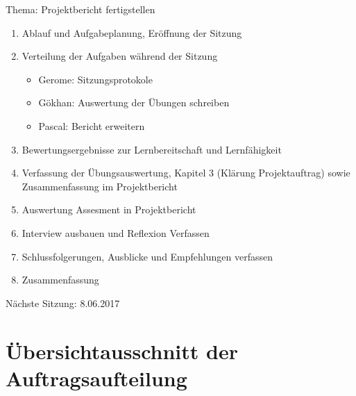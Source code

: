 Thema: Projektbericht fertigstellen
\begin{enumerate}

\item Ablauf und Aufgabeplanung, Eröffnung der Sitzung 

\item  Verteilung der Aufgaben während der Sitzung
\begin{itemize}
\item Gerome: Sitzungsprotokole
\item Gökhan: Auswertung der Übungen schreiben
\item Pascal: Bericht erweitern
\end{itemize}

\item Bewertungsergebnisse zur Lernbereitschaft und Lernfähigkeit

\item Verfassung der Übungsauswertung, Kapitel 3 (Klärung Projektauftrag)  sowie Zusammenfassung im Projektbericht 

\item Auswertung Assesment in Projektbericht

\item Interview ausbauen und Reflexion Verfassen

\item Schlussfolgerungen, Ausblicke und Empfehlungen verfassen 

\item Zusammenfassung

\end{enumerate}

Nächste Sitzung: 8.06.2017

\newpage

\section*{Übersichtausschnitt der Auftragsaufteilung}

